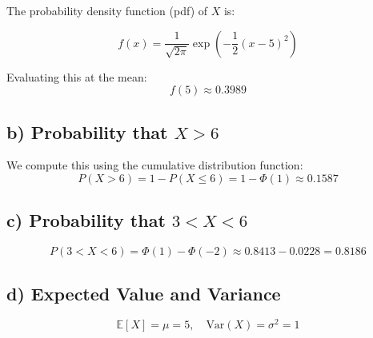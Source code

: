 \documentclass[12pt]{article}
\begin{document}
The probability density function (pdf) of $X$ is:

\[
f(x) = \frac{1}{\sqrt{2\pi}} \exp\left(-\frac{1}{2}(x - 5)^2\right)
\]

Evaluating this at the mean:
\[
f(5) \approx 0.3989
\]

\subsection*{b) Probability that $X > 6$}

We compute this using the cumulative distribution function:
\[
P(X > 6) = 1 - P(X \leq 6) = 1 - \Phi(1) \approx 0.1587
\]

\subsection*{c) Probability that $3 < X < 6$}

\[
P(3 < X < 6) = \Phi(1) - \Phi(-2) \approx 0.8413 - 0.0228 = 0.8186
\]

\subsection*{d) Expected Value and Variance}

\[
\mathbb{E}[X] = \mu = 5, \quad \text{Var}(X) = \sigma^2 = 1
\]
\end{document}
